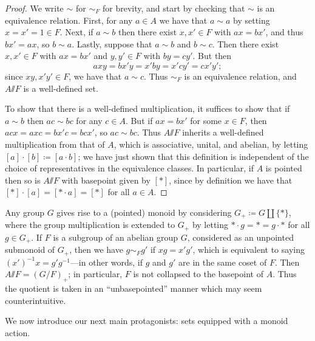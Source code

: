 \documentclass[11pt]{amsart}
\renewcommand{\ss}{\mathord{\sslash}}
\begin{document}
\begin{proof}
    We write $\sim$ for $\sim_F$ for brevity, and start by checking that $\sim$ is an equivalence relation. First, for any $a\in A$ we have that $a\sim a$ by setting $x = x' = 1\in F$.  Next, if $a \sim b$ then there exist $x,x'\in F$ with $ax = bx'$, and thus $bx' = ax$, so $b \sim a$. Lastly, suppose that $a \sim b$ and $b \sim c$.  Then there exist $x,x'\in F$ with $ax = bx'$ and $y,y'\in F$ with $by = cy'$.  But then \[axy = bx'y = x'by=x'cy'=cx'y';\] since $xy, x'y'\in F$, we have that $a \sim c$.  Thus $\sim_F$ is an equivalence relation, and $A\ss F$ is a well-defined set.

    To show that there is a well-defined multiplication, it suffices to show that if $a \sim b$ then $ac \sim bc$ for any $c\in A$.  But if $ax = bx'$ for some $x\in F$, then $acx = axc = bx'c=bcx'$, so $ac \sim bc$.  Thus $A\ss F$ inherits a well-defined multiplication from that of $A$, which is associative, unital, and abelian, by letting $[a]\cdot [b]\coloneqq [a\cdot b]$; we have just shown that this definition is independent of the choice of representatives in the equivalence classes.  %
    In particular, if $A$ is pointed then so is $A\ss F$ with basepoint given by $[*]$, since by definition we have that $[*]\cdot [a]=[*\cdot a]=[*]$ for all $a\in A$.
\end{proof}

\begin{example}\label{groups.as.monoids}
   Any group $G$ gives rise to a (pointed) monoid by considering $G_+\coloneqq G\amalg \{*\}$, where the group multiplication is extended to $G_+$ by letting $*\cdot g=*=g\cdot *$ for all $g\in G_+$. If $F$ is a subgroup of an abelian group $G$, considered as an unpointed submonoid of $G_+$, then we have $g\sim_F g'$ if $xg = x'g'$, which is equivalent to saying $(x')^{-1}x = g'g^{-1}$---in other words, if $g$ and $g'$ are in the same coset of $F$. Then $A\ss F = (G/F)_+$; in particular, $F$ is not collapsed to the basepoint of $A$.  Thus the quotient is taken in an ``unbasepointed'' manner which may seem counterintuitive.
\end{example}



We now introduce our next main protagonists: sets equipped with a monoid action.
\end{document}
